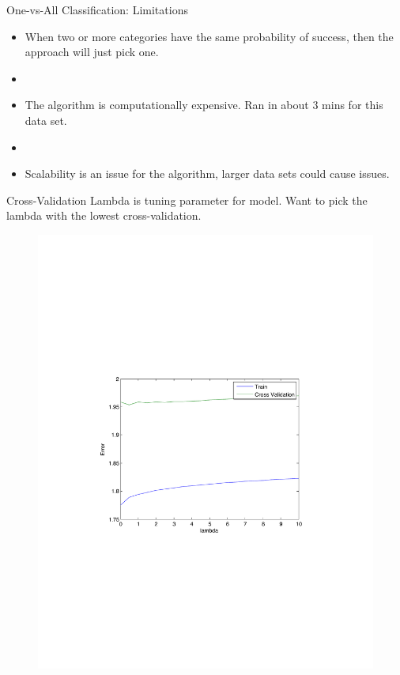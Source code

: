 \documentclass{beamer}
\begin{document}
\begin{frame}{One-vs-All Classification: Limitations}
	\begin{itemize}

	 \item When two or more categories have the same probability of success, then the approach will just pick one. 
	 \item[]
	 \item The algorithm is computationally expensive. Ran in about 3 mins for this data set.
	 \item[]
	 \item Scalability is an issue for the algorithm, larger data sets could cause issues.
	\end{itemize}

\end{frame}

\begin{frame}{Cross-Validation}
Lambda is tuning parameter for model. Want to pick the lambda with the lowest cross-validation. 

	\begin{figure}
		\centering
		\includegraphics[scale=0.5]{../images/validationcurve.pdf}
	\end{figure}

\end{frame}
\end{document}
